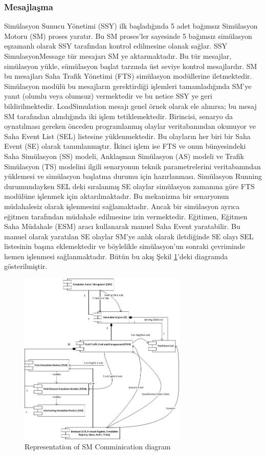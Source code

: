 \documentclass[conference]{IEEEtran}
\begin{document}
\subsubsection{Mesajlaşma}
Simülasyon Sunucu Yönetimi (SSY) ilk başladığında 5 adet bağımsız Simülasyon Motoru (SM) proses yaratır. Bu SM proses’ler sayesinde 5 bağımsız simülasyon eşzamanlı olarak SSY tarafından kontrol edilmesine olanak sağlar. SSY SimulasyonMessage tür mesajarı SM ye aktarmaktadır. Bu tür mesajlar, simülasyon yükle, sümülasyon başlat tarzında üst seviye kontrol mesajlardır. SM bu mesajları Saha Trafik Yönetimi (FTS) simülasyon modüllerine iletmektedir. Simülasyon modülü bu mesajların gerektirdiği işlemleri tamamladığında SM’ye yanıt (olumlu veya olumsuz) vermektedir ve bu netice SSY ye geri bildirilmektedir.
LoadSimulation mesajı genel örnek olarak ele alınırsa; bu mesaj SM tarafından alındığında iki işlem tetiklemektedir. Birincisi, senaryo da oynatılması gereken önceden programlanmış olaylar veritabanından okunuyor ve Saha Event List (SEL) listesine yüklenmektedir. Bu olayların her biri bir Saha Event (SE) olarak tanımlanmıştır. 
İkinci işlem ise FTS ve onun bünyesindeki Saha Simülasyon (SS) modeli, Anklaşman Simülasyon (AS) modeli ve Trafik Simülasyon (TS) modelini ilgili senaryonun teknik parametrelerini veritabanından yüklemesi ve simülasyon başlatma durumu için hazırlanması.
Simülasyon Running durumundayken SEL deki sıralanmış SE olaylar simülasyon zamanına göre FTS modülüne işlenmek için aktarılmaktadır. Bu mekanizma bir senaryonun müdahalesiz olarak işlenmesini sağlamaktadır. Ancak bir simülasyon ayrıca eğitmen tarafından müdahale edilmesine izin vermektedir. Eğitimen, Eğitmen Saha Müdahale (ESM) aracı kullanarak manuel Saha Event yaratabilir. Bu manuel olarak yaratılan SE olaylar SM’ye anlık olarak iletdiğinde SE olayı SEL listesinin başına eklemektedir ve böylelikle simülasyon’un sonraki çevriminde hemen işlenmesi sağlanmaktadır. Bütün bu akış Şekil \ref{fig:smCommunicationDiagram}'deki diagramda gösterilmiştir.

\begin{figure}[h!]
  \centering
  \includegraphics[width=8cm]{smCommunicationDiagram.jpg}
  \caption{Representation of SM Comminication diagram}\label{fig:smCommunicationDiagram}
\end{figure}
\end{document}
